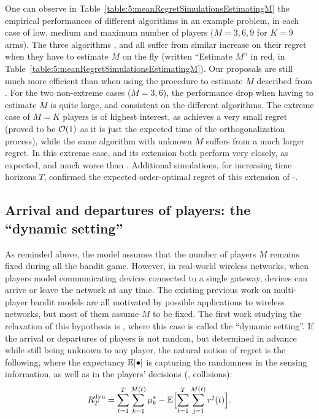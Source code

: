 One can observe in Table~\ref{table:5:meanRegretSimulationsEstimatingM} the empirical performances of different algorithms in an example problem, in each case of low, medium and maximum number of players ($M=3,6,9$ for $K=9$ arms).
The three algorithms \RhoRand, \RandTopM{} and \MCTopM{} all suffer from similar increase on their regret when they have to estimate $M$ on the fly (written ``Estimate $M$'' in red, in Table~\ref{table:5:meanRegretSimulationsEstimatingM}). Our proposals are still much more efficient than \RhoRand{} when using the procedure to estimate $M$ described from \cite{Anandkumar11}.
For the two non-extreme cases ($M=3,6$), the performance drop when having to estimate $M$ is quite large,
and consistent on the different algorithms.
The extreme case of $M=K$ players is of highest interest, as \MCTopM{} achieves a very small regret (proved to be $\mathcal{O}(1)$ as it is just the expected time of the orthogonalization process), while the same algorithm with unknown $M$ suffers from a much larger regret.
In this extreme case, \RhoRand{} and its extension both perform very closely, as expected, and much worse than \MCTopM.
%
Additional simulations, for increasing time horizons $T$, confirmed the expected order-optimal regret of this extension of \MCTopM-\klUCB.


\subsection{Arrival and departures of players: the ``dynamic setting''}
\label{sub:5:arrivalDepartures}

As reminded above, the model assumes that the number of players $M$ remains fixed during all the bandit game.
However, in real-world wireless networks, when players model communicating devices connected to a single gateway, devices can arrive or leave the network at any time.
The existing previous work on multi-player bandit models are all motivated by possible applications to wireless networks, but most of them assume $M$ to be fixed.
The first work studying the relaxation of this hypothesis is \cite{Rosenski16}, where this case is called the ``dynamic setting''.
If the arrival or departures of players is not random, but determined in advance while still being unknown to any player, the natural notion of regret is the following, where the expectancy $\mathbb{E}[\bullet]$ is capturing the randomness in the sensing information, as well as in the players' decisions (\ie, collisions):
\begin{equation}\label{eq:5:defRegretDynamicSetting}
    R_T^{\text{dyn}} = \sum_{t=1}^T \sum_{k=1}^{M(t)} \mu^*_{k} - \mathbb{E}\Bigl[ \sum_{t=1}^T \sum_{j=1}^{M(t)} r^j(t) \Bigr].
\end{equation}

